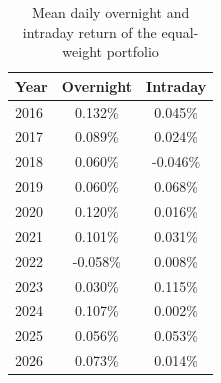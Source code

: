 \begin{table}[H]
\centering
\caption{Mean daily overnight and intraday return of the equal-weight portfolio}
\begin{tabular}{lcc}
\toprule
Year & Overnight & Intraday \\
\midrule
2016 & 0.132\% & 0.045\% \\
2017 & 0.089\% & 0.024\% \\
2018 & 0.060\% & -0.046\% \\
2019 & 0.060\% & 0.068\% \\
2020 & 0.120\% & 0.016\% \\
2021 & 0.101\% & 0.031\% \\
2022 & -0.058\% & 0.008\% \\
2023 & 0.030\% & 0.115\% \\
2024 & 0.107\% & 0.002\% \\
2025 & 0.056\% & 0.053\% \\
2026 & 0.073\% & 0.014\% \\
\bottomrule
\end{tabular}
\end{table}
